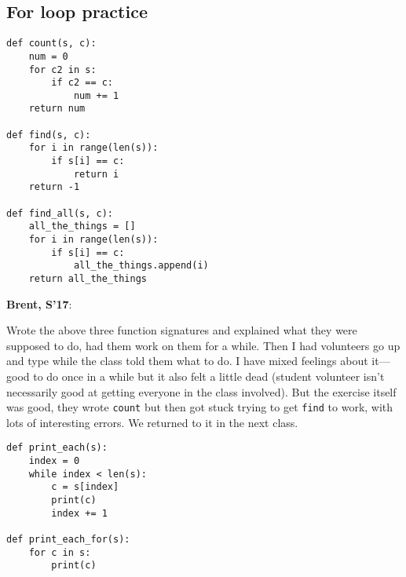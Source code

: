 \documentclass{article}
\newenvironment{reflect}[1]
{
  \noindent
  \begin{lrbox}{\reflectbox}
    \begin{minipage}[t]{\textwidth}
      \textbf{#1}:
}{
    \end{minipage}
  \end{lrbox}
  \fbox{\usebox{\reflectbox}}
}
\begin{document}
\subsection*{For loop practice}

\begin{verbatim}
def count(s, c):
    num = 0
    for c2 in s:
        if c2 == c:
            num += 1
    return num

def find(s, c):
    for i in range(len(s)):
        if s[i] == c:
            return i
    return -1

def find_all(s, c):
    all_the_things = []
    for i in range(len(s)):
        if s[i] == c:
            all_the_things.append(i)
    return all_the_things
\end{verbatim}

\begin{reflect}{Brent, S'17}
  Wrote the above three function signatures and explained what they
  were supposed to do, had them work on them for a while.  Then I had
  volunteers go up and type while the class told them what to do.  I
  have mixed feelings about it---good to do once in a while but it
  also felt a little dead (student volunteer isn't necessarily good at
  getting everyone in the class involved).  But the exercise itself
  was good, they wrote \verb|count| but then got stuck trying to get
  \verb|find| to work, with lots of interesting errors.  We returned
  to it in the next class.
\end{reflect}

\begin{verbatim}
def print_each(s):
    index = 0
    while index < len(s):
        c = s[index]
        print(c)
        index += 1

def print_each_for(s):
    for c in s:
        print(c)
\end{verbatim}





\end{document}
